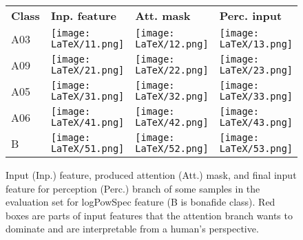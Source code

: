 \documentclass[a4paper]{article}
\begin{document}
\begin{figure}[H]
\centering
    \begin{tabular}{|m{0.75cm}m{1.7cm}m{1.7cm}m{1.7cm}|}
    \hline
    \textbf{Class} &
    \textbf{Inp. feature} &
    \textbf{Att. mask} &
    \textbf{Perc. input}
    \\
    A03 &
    \texttt{[image: LaTeX/11.png]} &
    \texttt{[image: LaTeX/12.png]} &
    \texttt{[image: LaTeX/13.png]}
    \\
    A09 &
    \texttt{[image: LaTeX/21.png]} &
    \texttt{[image: LaTeX/22.png]} &
    \texttt{[image: LaTeX/23.png]}
    \\
    A05 &
    \texttt{[image: LaTeX/31.png]} &
    \texttt{[image: LaTeX/32.png]} &
    \texttt{[image: LaTeX/33.png]}
    \\
    A06 &
    \texttt{[image: LaTeX/41.png]} &
    \texttt{[image: LaTeX/42.png]} &
    \texttt{[image: LaTeX/43.png]}
    \\
    B &
    \texttt{[image: LaTeX/51.png]} &
    \texttt{[image: LaTeX/52.png]} &
    \texttt{[image: LaTeX/53.png]}
    \\
    \hline
    \end{tabular}
\caption{Input (Inp.) feature, produced attention (Att.) mask, and final input feature for perception (Perc.) branch of some samples in the evaluation set for logPowSpec feature (B is bonafide class). Red boxes are parts of input features that the attention branch wants to dominate and are interpretable from a human’s perspective.}
\label{fig:spec}
\end{figure}
\end{document}
